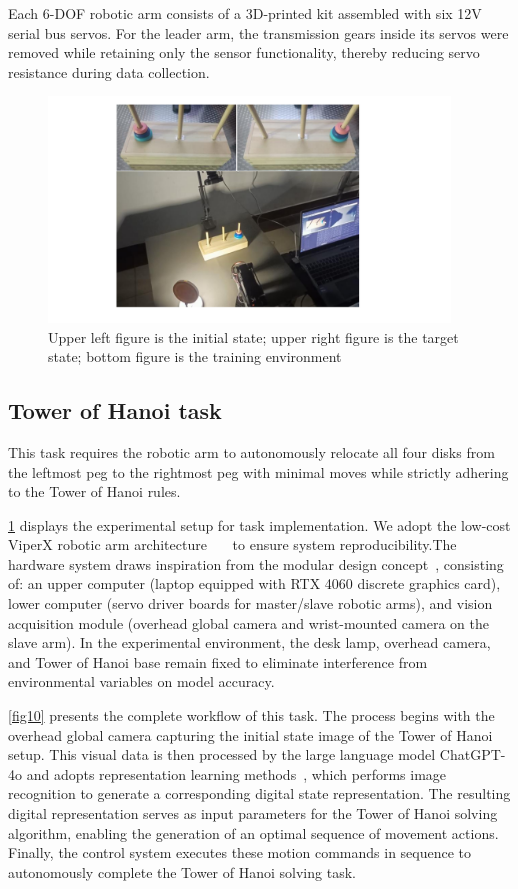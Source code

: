 \documentclass[runningheads]{llncs}
\begin{document}
Each 6-DOF robotic arm consists of a 3D-printed kit assembled with six 12V serial bus servos. For the leader arm, the transmission gears inside its servos were removed while retaining only the sensor functionality, thereby reducing servo resistance during data collection.


\begin{figure}
\centering
  \includegraphics[width=0.95\textwidth]{fig4.pdf}
  \caption{Upper left figure is the initial state; upper right figure is the target state; bottom figure is the training environment} \label{fig2}
  \end{figure}

\subsection{Tower of Hanoi task}

This task requires the robotic arm to autonomously relocate all four disks from the leftmost peg to the rightmost peg with minimal moves while strictly adhering to the Tower of Hanoi rules.

\cref{fig2} displays the experimental setup for task implementation. We adopt the low-cost ViperX robotic arm architecture~\cite{ref1}~\cite{ref2}~\cite{ref3} to ensure system reproducibility.The hardware system draws inspiration from the modular design concept~\cite{ref4}, consisting of: an upper computer (laptop equipped with RTX 4060 discrete graphics card), lower computer (servo driver boards for master/slave robotic arms), and vision acquisition module (overhead global camera and wrist-mounted camera on the slave arm). In the experimental environment, the desk lamp, overhead camera, and Tower of Hanoi base remain fixed to eliminate interference from environmental variables on model accuracy.

\cref{fig10} presents the complete workflow of this task. The process begins with the overhead global camera capturing the initial state image of the Tower of Hanoi setup. This visual data is then processed by the large language model ChatGPT-4o and adopts representation learning methods~\cite{ref5}, which performs image recognition to generate a corresponding digital state representation. The resulting digital representation serves as input parameters for the Tower of Hanoi solving algorithm, enabling the generation of an optimal sequence of movement actions. Finally, the control system executes these motion commands in sequence to autonomously complete the Tower of Hanoi solving task.
\end{document}
